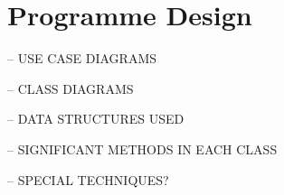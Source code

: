 \section{Programme Design}

-- USE CASE DIAGRAMS

-- CLASS DIAGRAMS

-- DATA STRUCTURES USED

-- SIGNIFICANT METHODS IN EACH CLASS

-- SPECIAL TECHNIQUES?